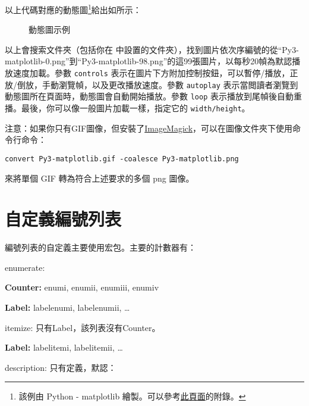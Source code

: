 以上代碼對應的動態圖\footnote{該例由 Python - matplotlib 繪製。可以參考\href{https://wklchris.github.io/Py3-matplotlib.html}{此頁面}的附錄。}給出如所示：
\begin{figure}[!hbt]
  \centering
  \caption{動態圖示例}\label{fig:GIF}
\end{figure}

以上會搜索文件夾（包括你在  中設置的文件夾），找到圖片依次序編號的從“Py3-matplotlib-0.png”到“Py3-matplotlib-98.png”的這99張圖片，以每秒20幀為默認播放速度加載。參數 \texttt{controls} 表示在圖片下方附加控制按鈕，可以暫停/播放，正放/倒放，手動瀏覽幀，以及更改播放速度。參數 \texttt{autoplay} 表示當閲讀者瀏覽到動態圖所在頁面時，動態圖會自動開始播放。參數 \texttt{loop} 表示播放到尾幀後自動重播。最後，你可以像一般圖片加載一樣，指定它的 \texttt{width/height}。

注意：如果你只有GIF圖像，但安裝了\href{https://www.imagemagick.org/script/download.php}{ImageMagick}，可以在圖像文件夾下使用命令行命令：

\begin{verbatim}
convert Py3-matplotlib.gif -coalesce Py3-matplotlib.png
\end{verbatim}

來將單個 GIF 轉為符合上述要求的多個 png 圖像。

\section{自定義編號列表}
\label{sec:list}
編號列表的自定義主要使用宏包。主要的計數器有：
\begin{feai}
\item enumerate:
  \begin{feai}
    \item \textbf{Counter:} enumi, enumii, enumiii, enumiv
    \item \textbf{Label:} labelenumi, labelenumii, \ldots
  \end{feai}
\item itemize: 只有Label，該列表沒有Counter。 
  \begin{feai}
    \item \textbf{Label:} labelitemi, labelitemii, \ldots
  \end{feai}
\item description: 只有定義，默認：
\begin{latex}
\newcommand*{\descriptionlabel}[1]{\hspace\labelsep
    \normalfont\bfseries #1} %
\end{latex}
\end{feai}

